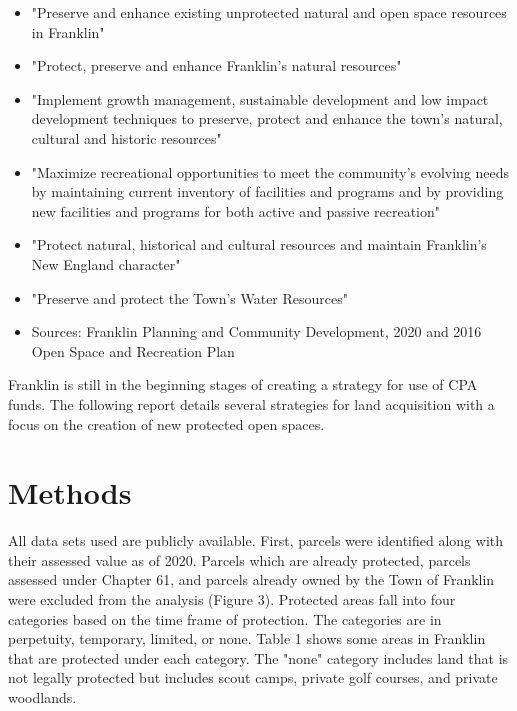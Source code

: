 \documentclass[12pt, stu, floatsintext,table]{apa7}
\begin{document}
\begin{itemize}
\setlength\itemsep{0.0em}
    \item "Preserve and enhance existing unprotected natural and open space resources in Franklin"
    \item "Protect, preserve and enhance Franklin’s natural resources"
    \item "Implement growth management, sustainable development and low impact development techniques to preserve, protect and enhance the town's natural, cultural and historic resources"
     \item "Maximize recreational opportunities to meet the community’s evolving needs by maintaining current inventory of facilities and programs and by providing new facilities and programs for both active and passive recreation"
    \item  "Protect natural, historical and cultural resources and maintain Franklin's New England character"
    \item "Preserve and protect the Town’s Water Resources"
    \item Sources: Franklin Planning and Community Development, 2020 and 2016 Open Space and Recreation Plan
\end{itemize}  
Franklin is still in the beginning stages of creating a strategy for use of CPA funds. The following report details several strategies for land acquisition with a focus on the creation of new protected open spaces. 


\section{Methods}  
All data sets used are publicly available. First, parcels were identified along with their assessed value as of 2020. Parcels which are already protected, parcels assessed under Chapter 61, and parcels already owned by the Town of Franklin were excluded from the analysis (Figure 3). Protected areas fall into four categories based on the time frame of protection. The categories are in perpetuity, temporary, limited, or none. Table 1 shows some areas in Franklin that are protected under each category. The "none" category includes land that is not legally protected but includes scout camps, private golf courses, and private woodlands.
\end{document}
